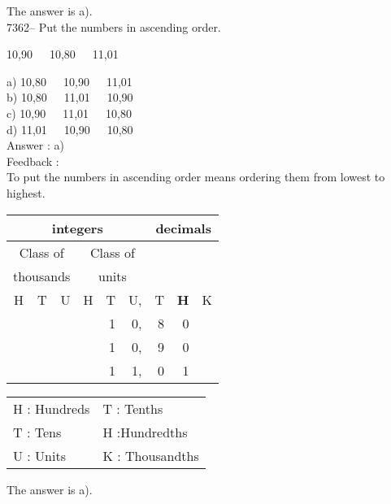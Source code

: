 \documentclass[letterpaper, 12pt]{article}
\begin{document}
\normalsize
The answer is a).\\


7362-- Put the numbers in ascending order.\\  
\begin{center}
10,90\ \ \ 10,80\ \ \ 11,01\\
\end{center}

a) 10,80\ \ \ 10,90\ \ \ 11,01\\
b) 10,80\ \ \ 11,01\ \ \ 10,90\\
c) 10,90\ \ \ 11,01\ \ \ 10,80\\
d) 11,01\ \ \ 10,90\ \ \ 10,80\\

Answer : a)\\

Feedback :\\
To put the numbers in ascending order means ordering them from lowest to highest.\\
\begin{center}
\begin{tabular}{|rrr|rrr|rrr|}
\hline
\multicolumn{6}{|c|}{integers} &\multicolumn{3}{|c|}{decimals} \\
\hline
\multicolumn{3}{|c|}{Class of} &\multicolumn{3}{|c|}{Class of} &  \multicolumn{3}{c|}{} \\
\multicolumn{3}{|c|}{thousands} &\multicolumn{3}{|c|}{units} &  \multicolumn{3}{c|}{} \\
\hline
H & T & U &H & T & U, & T\up{th} & \textbf{H\up{th}} & K\up{th} \\
\hline
\hline
& & & & 1 & 0, & 8 & 0 &\\
& & & & 1 & 0, & 9 & 0 &\\
& & & & 1 & 1, & 0 & 1 &\\
\hline
\end{tabular}
\end{center}

\scriptsize
\begin{center}
\begin{tabular}{ll}
H : Hundreds & T\up{th} : Tenths\\
T : Tens & H\up{th} :Hundredths\\
U : Units & K\up{e} : Thousandths\\
\end{tabular}
\end{center}

\normalsize
The answer is a).\\
\end{document}
